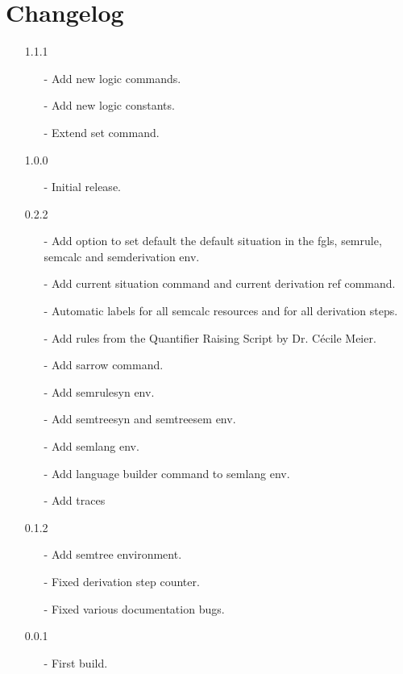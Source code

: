 \documentclass[10pt, a4paper]{article}
\begin{document}
	\section{Changelog}
	\begin{itemize}
		\item[1.1.1] 
				\begin{enumerate}
					\item[-] Add new logic commands.
					\item[-] Add new logic constants.
					\item[-] Extend set command.
				\end{enumerate}
		\item[1.0.0] 
		\begin{enumerate}
			\item[-] Initial release.
		\end{enumerate}
		\item[0.2.2] 
		\begin{enumerate}
			\item[-] Add option to set default the default situation in the fgls, semrule, semcalc and semderivation env.
			\item[-] Add current situation command and current derivation ref command.
			\item[-] Automatic labels for all semcalc resources and for all derivation steps.
			\item[-] Add rules from the Quantifier Raising Script by Dr. C\'{e}cile Meier.
			\item[-] Add sarrow command.
			\item[-] Add semrulesyn env.
			\item[-] Add semtreesyn and semtreesem env.
			\item[-] Add semlang env.
			\item[-] Add language builder command to semlang env.
			\item[-] Add traces
		\end{enumerate}
		\item[0.1.2] 
		\begin{enumerate}
			\item[-] Add semtree environment.
			\item[-] Fixed derivation step counter.
			\item[-] Fixed various documentation bugs.
		\end{enumerate}
		\item[0.0.1] 
		\begin{enumerate}
			\item[-] First build.
		\end{enumerate}
	\end{itemize}
\end{document}
